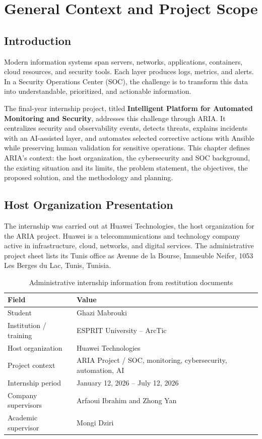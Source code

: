 \chapter{General Context and Project Scope}
\label{ch:context}

\section{Introduction}

Modern information systems span servers, networks, applications, containers, cloud resources, and security tools. Each layer produces logs, metrics, and alerts. In a Security Operations Center (SOC), the challenge is to transform this data into understandable, prioritized, and actionable information.

The final-year internship project, titled \textbf{Intelligent Platform for Automated Monitoring and Security}, addresses this challenge through ARIA. It centralizes security and observability events, detects threats, explains incidents with an AI-assisted layer, and automates selected corrective actions with Ansible while preserving human validation for sensitive operations. This chapter defines ARIA's context: the host organization, the cybersecurity and SOC background, the existing situation and its limits, the problem statement, the objectives, the proposed solution, and the methodology and planning.

\section{Host Organization Presentation}

The internship was carried out at Huawei Technologies, the host organization for the ARIA project. Huawei is a telecommunications and technology company active in infrastructure, cloud, networks, and digital services. The administrative project sheet lists its Tunis office as Avenue de la Bourse, Immeuble Neifer, 1053 Les Berges du Lac, Tunis, Tunisia.

\begin{table}[H]
\centering
\caption{Administrative internship information from restitution documents}
\begin{tabularx}{\textwidth}{@{}p{}Y@{}}
\toprule
\textbf{Field} & \textbf{Value} \\
\midrule
Student & Ghazi Mabrouki \\
Institution / training & ESPRIT University -- ArcTic \\
Host organization & Huawei Technologies \\
Project context & ARIA Project / SOC, monitoring, cybersecurity, automation, AI \\
Internship period & January 12, 2026 -- July 12, 2026 \\
Company supervisors & Arfaoui Ibrahim and Zhong Yan \\
Academic supervisor & Mongi Dziri \\
\bottomrule
\end{tabularx}
\end{table}

